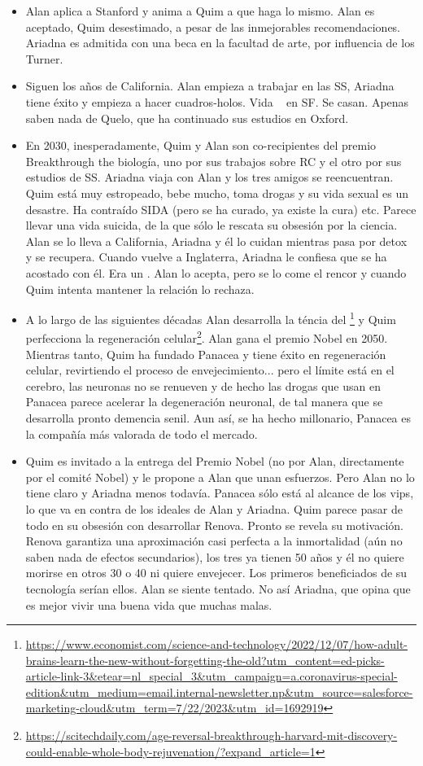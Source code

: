 \begin{itemize}
\item Alan aplica a Stanford y anima a Quim a que haga lo mismo. Alan es aceptado, Quim desestimado, a pesar de las inmejorables recomendaciones. Ariadna es admitida con una beca en la facultad de arte, por influencia de los Turner. 
\item Siguen los años de California. Alan empieza a trabajar en las SS, Ariadna tiene éxito y empieza a hacer cuadros-holos. Vida ~ en SF. Se casan. Apenas saben nada de Quelo, que ha continuado sus estudios en Oxford. 
\item En 2030, inesperadamente, Quim y Alan son co-recipientes del premio Breakthrough the biología, uno por sus trabajos sobre RC y el otro por sus estudios de SS. Ariadna viaja con Alan y los tres amigos se reencuentran. Quim está muy estropeado, bebe mucho, toma drogas y su vida sexual es un desastre. Ha contraído SIDA (pero se ha curado, ya existe la cura) etc. Parece llevar una vida suicida, de la que sólo le rescata su obsesión por la ciencia.  Alan se lo lleva a California, Ariadna y él lo cuidan mientras pasa por detox y se recupera. Cuando vuelve a Inglaterra, Ariadna le confiesa que se ha acostado con él. Era un . Alan lo acepta, pero se lo come el rencor y cuando Quim intenta mantener la relación lo rechaza. 
\item A lo largo de las siguientes décadas Alan desarrolla la téncia del \footnote{\url{https://www.economist.com/science-and-technology/2022/12/07/how-adult-brains-learn-the-new-without-forgetting-the-old?utm_content=ed-picks-article-link-3&etear=nl_special_3&utm_campaign=a.coronavirus-special-edition&utm_medium=email.internal-newsletter.np&utm_source=salesforce-marketing-cloud&utm_term=7/22/2023&utm_id=1692919}} y Quim perfecciona la regeneración celular\footnote{\url{https://scitechdaily.com/age-reversal-breakthrough-harvard-mit-discovery-could-enable-whole-body-rejuvenation/?expand_article=1}}. Alan gana el premio Nobel en 2050. Mientras tanto, Quim ha fundado Panacea y tiene éxito en regeneración celular, revirtiendo el proceso de envejecimiento... pero el límite está en el cerebro, las neuronas no se renueven y de hecho las drogas que usan en Panacea parece acelerar la degeneración neuronal, de tal manera que se desarrolla pronto demencia senil. Aun así, se ha hecho millonario, Panacea es la compañía más valorada de todo el mercado. 
\item Quim es invitado a la entrega del Premio Nobel (no por Alan, directamente por el comité Nobel) y le propone a Alan que unan esfuerzos. Pero Alan no lo tiene claro y Ariadna menos todavía. Panacea sólo está al alcance de los vips, lo que va en contra de los ideales de Alan y Ariadna. Quim parece pasar de todo en su obsesión con desarrollar Renova. Pronto se revela su motivación. Renova garantiza una aproximación casi perfecta a la inmortalidad (aún no saben nada de efectos secundarios), los tres ya tienen 50 años y él no quiere morirse en otros 30 o 40 ni quiere envejecer. Los primeros beneficiados de su tecnología serían ellos. Alan se siente tentado. No así Ariadna, que opina que es mejor vivir una buena vida que muchas malas.  

\end{itemize}
